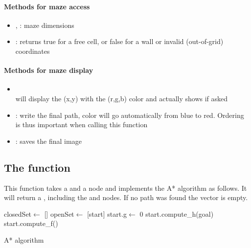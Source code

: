 \documentclass{ecnreport}
\begin{document}
\paragraph{Methods for maze access}
\begin{itemize}
 \item {}, : maze dimensions
 \item {}: returns true for a free cell, or false for a wall or invalid (out-of-grid) coordinates
\end{itemize}

\paragraph{Methods for maze display}
\begin{itemize}
 \item {}\\
    will display the (x,y) with the (r,g,b) color and actually shows if asked
 \item {}: write the final path, color will go automatically from blue to red.
 Ordering is thus important when calling this function
 \item {}: saves the final image
\end{itemize}

\subsection{The  function}\label{aStar}

This function takes a  and a  node and implements the A* algorithm as follows. It will return a , including the   and  nodes. If no path was found the vector is empty.

\begin{algorithm}[h!]
{}
closedSet$\gets$ []\;
openSet$\gets$ [start]\;
start.g$\gets$ 0\;
start.compute\_h(goal)\;
start.compute\_f()\;
\caption{A* algorithm}
\label{algo:smallpoly}
\end{algorithm}
\end{document}

